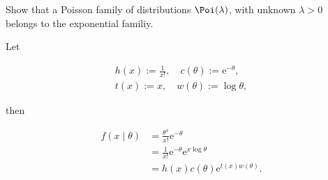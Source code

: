 
\begin{exercise}

Show that a Poisson family of distributions $\Poi(\lambda)$, with unknown $\lambda > 0$ belongs to the exponential familiy.

\end{exercise}


\begin{solution}

Let

\begin{gather*}
    h(x) := \frac{1}{x!},
    \quad
    c(\theta) := \mathrm e^{-\theta}, \\
    t(x) := x,
    \quad
    w(\theta) := \log \theta,
\end{gather*}

then

\begin{align*}
    f(x \mid \theta)
    & =
    \frac{\theta^x}{x!} \mathrm e^{-\theta} \\
    & =
    \frac{1}{x!} \mathrm e^{-\theta} \mathrm e^{x \log \theta} \\
    & =
    h(x) c(\theta) \mathrm e^{t(x) w(\theta)}.
\end{align*}

\end{solution}

